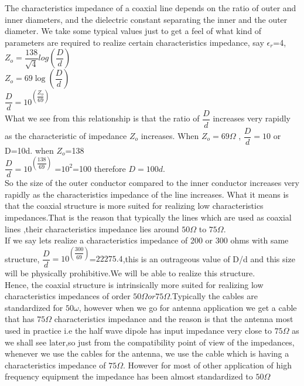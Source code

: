 The characteristics impedance of a coaxial line depends on the ratio of outer and inner diameters, and the dielectric constant separating the inner and the outer diameter.
We take some typical values just to get a feel of what kind of parameters are required to realize certain characteristics impedance, say $\epsilon_r$=4,
$Z_o=\dfrac{138}{\sqrt{4}}log(\dfrac{D}{d})$\\
$Z_o=69\log(\dfrac{D}{d})$\\
$\dfrac{D}{d}=10^{(\dfrac{Z_o}{69})}$
 \\
What we see from this relationship is that the ratio of $\dfrac{D}{d}$  increases very rapidly as the characteristic of impedance $Z_o$ increases. When $Z_o=69\varOmega$ , $\dfrac{D}{d}=10$ or  D=10d. when $Z_o$=138\\
$\dfrac{D}{d}=10^{(\dfrac{138}{69})}$
=$10^{2}$=100 therefore $D=100d$.\\
So the size of the outer conductor compared to the inner conductor increases very rapidly as the characteristics impedance of the line increases. What it means is that the coaxial structure is more suited for realizing low characteristics impedances.That is the reason that typically the lines which are used as coaxial lines ,their characteristics impedance lies around $50\Omega$ to $75\Omega$. \\ 
 If we say lets realize a characteristics impedance of 200 or 300 ohms with same structure, $\dfrac{D}{d}=10^{(\dfrac{300}{69})}$=$22275.4$,this is an outrageous value of D/d and this size will be physically prohibitive.We will  be able to realize this structure.\\
 Hence, the coaxial structure is intrinsically more suited for realizing low characteristics impedances of order $50\Omega or 75\Omega$.Typically the cables are standardized for $50\omega$, however when we go for antenna application we get a cable that has $75\Omega$ characteristics impedance  and the reason is that the antenna most used in practice i.e the half wave dipole has input impedance very close to $75\Omega$ as we shall see later,so just from the compatibility point of view of the impedances, whenever we use the cables for the antenna, we use the cable which is having a characteristics impedance of $75\Omega$. However for most of other application of high frequency equipment the impedance has been almost standardized to $50\Omega$
 
